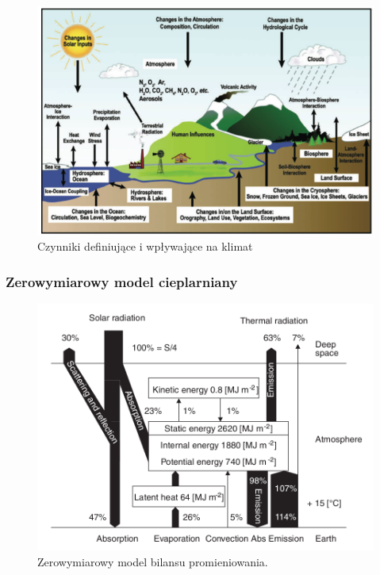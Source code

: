 \documentclass{beamer}
\begin{document}
\begin{frame}
	\frametitle{}
	\begin{figure}[h]
		\begin{center}
			\includegraphics[width=0.7\linewidth]{images/Figure1}
			\caption{Czynniki definiujące i wpływające na klimat}
		\end{center}
	\end{figure}
\end{frame}

\begin{frame}
	\frametitle{Zerowymiarowy model cieplarniany}
	\begin{figure}[h]
		\begin{center}
			\includegraphics[width=0.7\linewidth]{images/0D_Model.png}
			\caption{Zerowymiarowy model bilansu promieniowania.\cite{b2}}
		\end{center}
	\end{figure}

\end{frame}
\end{document}
